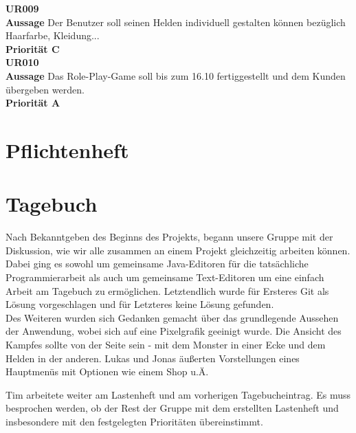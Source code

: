 \textbf{UR009}\\
\textbf{Aussage} Der Benutzer soll seinen Helden individuell gestalten können bezüglich Haarfarbe, Kleidung...\\
\textbf{Priorität C}\\

\textbf{UR010}\\
\textbf{Aussage} Das Role-Play-Game soll bis zum 16.10 fertiggestellt und dem Kunden übergeben werden.\\
\textbf{Priorität A}

\newpage

\section{Pflichtenheft}
\label{Pflichtenheft}

\newpage

\section{Tagebuch}
\label{Tagebuch}


Nach Bekanntgeben des Beginns des Projekts, begann unsere Gruppe mit der Diskussion, wie wir alle zusammen an einem Projekt gleichzeitig arbeiten können. Dabei ging es sowohl um gemeinsame Java-Editoren für die tatsächliche Programmierarbeit als auch um gemeinsame Text-Editoren um eine einfach Arbeit am Tagebuch zu ermöglichen. Letztendlich wurde für Ersteres Git als Lösung vorgeschlagen und für Letzteres keine Lösung gefunden.\\
Des Weiteren wurden sich Gedanken gemacht über das grundlegende Aussehen der Anwendung, wobei sich auf eine \glqq{}Pixelgrafik\grqq{} geeinigt wurde. Die Ansicht des Kampfes sollte von der Seite sein - mit dem Monster in einer Ecke und dem Helden in der anderen. Lukas und Jonas äußerten Vorstellungen eines Hauptmenüs mit Optionen wie einem Shop u.Ä.\\


Tim arbeitete weiter am Lastenheft und am vorherigen Tagebucheintrag. Es muss besprochen werden, ob der Rest der Gruppe mit dem erstellten Lastenheft und insbesondere mit den festgelegten Prioritäten übereinstimmt.



